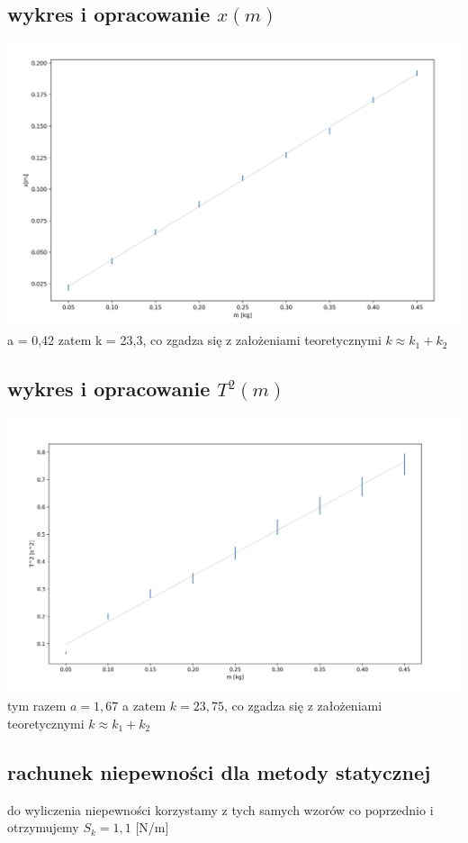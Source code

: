 \documentclass{article}
\begin{document}
\subsection{wykres i opracowanie $x(m)$}
\includegraphics[width=15cm]{m7_4a}
a = 0,42 zatem k = 23,3, co zgadza się z założeniami teoretycznymi $k\approx k_1 + k_2$ 

\subsection{wykres i opracowanie $T^2(m)$}
\includegraphics[width=15cm]{m7_4b}\\
tym razem $a=1,67$ a zatem $k = 23,75$,  co zgadza się z założeniami teoretycznymi $k\approx k_1 + k_2$ 

\subsection{rachunek niepewności dla metody statycznej}
do wyliczenia niepewności korzystamy z tych samych wzorów co poprzednio i otrzymujemy
$S_k = 1,1$ [N/m]
\end{document}
